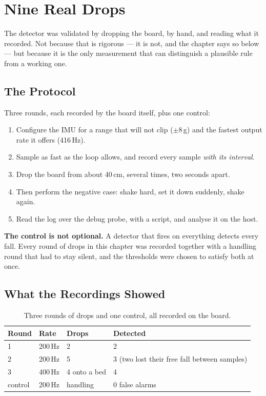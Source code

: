 \section{Nine Real Drops}
\label{sec:nine-real-drops}

The detector was validated by dropping the board, by hand, and reading what it recorded. Not
because that is rigorous — it is not, and the chapter says so below — but because it is the
only measurement that can distinguish a plausible rule from a working one.

\subsection{The Protocol}

Three rounds, each recorded by the board itself, plus one control:

\begin{enumerate}
    \item Configure the IMU for a range that will not clip ($\pm$8\,g) and the fastest output
          rate it offers (416\,Hz).
    \item Sample as fast as the loop allows, and record every sample \emph{with its interval}.
    \item Drop the board from about 40\,cm, several times, two seconds apart.
    \item Then perform the negative case: shake hard, set it down suddenly, shake again.
    \item Read the log over the debug probe, with a script, and analyse it on the host.
\end{enumerate}

\begin{notebox}
    \textbf{The control is not optional.} A detector that fires on everything detects every
    fall. Every round of drops in this chapter was recorded together with a handling round
    that had to stay silent, and the thresholds were chosen to satisfy both at once.
\end{notebox}

\subsection{What the Recordings Showed}

\begin{table}[H]
\centering
\begin{tabular}{llll}
\hline
\textbf{Round} & \textbf{Rate} & \textbf{Drops} & \textbf{Detected} \\
\hline
1 & 200\,Hz & 2 & 2 \\
2 & 200\,Hz & 5 & 3 (two lost their free fall between samples) \\
3 & 400\,Hz & 4 onto a bed & 4 \\
control & 200\,Hz & handling & 0 false alarms \\
\hline
\end{tabular}
\caption{Three rounds of drops and one control, all recorded on the board.}
\label{tab:drop-rounds}
\end{table}

